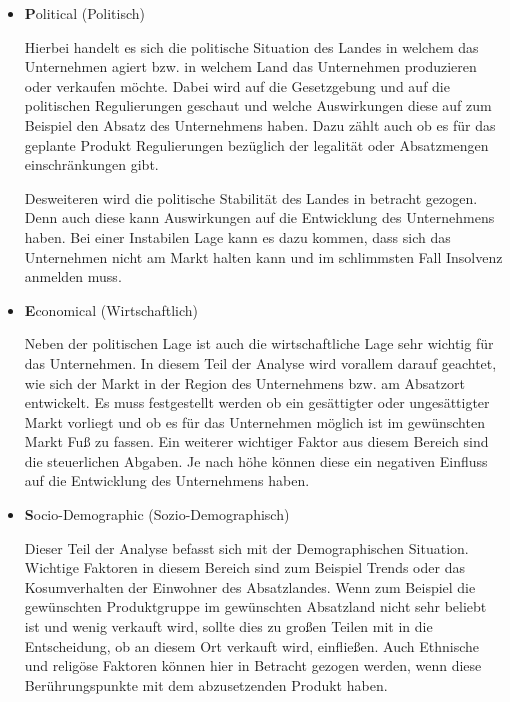             \begin{itemize}
                \item \textbf Political (Politisch)
    
                    Hierbei handelt es sich die politische Situation des Landes in welchem das Unternehmen agiert bzw. 
                    in welchem Land das Unternehmen produzieren oder verkaufen möchte. Dabei wird auf die Gesetzgebung 
                    und auf die politischen Regulierungen geschaut und welche Auswirkungen diese auf zum Beispiel den Absatz
                    des Unternehmens haben. Dazu zählt auch ob es für das geplante Produkt Regulierungen bezüglich der 
                    legalität oder Absatzmengen einschränkungen gibt.
    
                    Desweiteren wird die politische Stabilität des Landes in betracht gezogen. Denn auch diese kann 
                    Auswirkungen auf die Entwicklung des Unternehmens haben. Bei einer Instabilen Lage kann es dazu kommen,
                    dass sich das Unternehmen nicht am Markt halten kann und im schlimmsten Fall Insolvenz anmelden muss.
    
                \item \textbf Economical (Wirtschaftlich)
                
                    Neben der politischen Lage ist auch die wirtschaftliche Lage sehr wichtig für das Unternehmen. In diesem
                    Teil der Analyse wird vorallem darauf geachtet, wie sich der Markt in der Region des Unternehmens bzw. 
                    am Absatzort entwickelt. Es muss festgestellt werden ob ein gesättigter oder ungesättigter Markt 
                    vorliegt und ob es für das Unternehmen möglich ist im gewünschten Markt Fuß zu fassen. Ein weiterer 
                    wichtiger Faktor aus diesem Bereich sind die steuerlichen Abgaben. Je nach höhe können diese ein 
                    negativen Einfluss auf die Entwicklung des Unternehmens haben.
    
                \item \textbf Socio-Demographic (Sozio-Demographisch)
                
                    Dieser Teil der Analyse befasst sich mit der Demographischen Situation. Wichtige Faktoren in diesem 
                    Bereich sind zum Beispiel Trends oder das Kosumverhalten der Einwohner des Absatzlandes. Wenn zum 
                    Beispiel die gewünschten Produktgruppe im gewünschten Absatzland nicht sehr beliebt ist und wenig 
                    verkauft wird, sollte dies zu großen Teilen mit in die Entscheidung, ob an diesem Ort verkauft wird, 
                    einfließen. Auch Ethnische und religöse Faktoren können hier in Betracht gezogen werden, wenn diese 
                    Berührungspunkte mit dem abzusetzenden Produkt haben.
    

\end{itemize}
